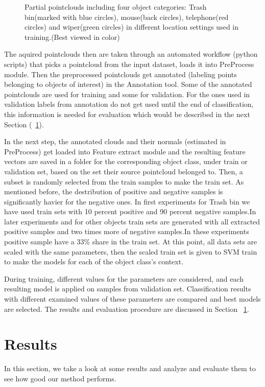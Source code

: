 \begin{figure} [htp]
\begin{center}
  \end{center}
  \caption[Train set pointclouds including four different object class.]
  {Partial pointclouds including four object categories: Trash bin(marked with blue circles), mouse(back circles), telephone(red circles) and wiper(green circles) in different location settings used in training.(Best viewed in color)}
  \label{TrainClouds2.figure:edge}
\end{figure}




The aquired pointclouds then are taken through an automated workflow (python scripts) that picks a pointcloud from the input dataset, loads it into PreProcess module. Then the preprocessed pointclouds get annotated (labeling points belonging to objects of interest) in the Annotation tool.
Some of the annotated pointclouds are used for training and some for validation. 
For the ones used in validation labels from annotation do not get used until the end of classification, this information is needed for evaluation which would be described in the next Section (~\ref{Results.sec}).


In the next step, the annotated clouds and their normals (estimated in PreProcess) get loaded into Feature extract module 
and the resulting feature vectors are saved in a folder for the corresponding object class, under train or validation set, based on the set their source pointcloud belonged to.
Then, a subset is randomly selected from the train samples to make the train set. As mentioned before, the destribution of positive and negative samples is significantly havier for the negative ones. In first experiments for Trash bin we have used train sets with 10 percent positive and 90 percent negative samples.In later experiments and for other objects train sets are generated with all extracted positive samples and two times more of negative samples.In these experiments positive sample have a 33\% share in the train set. At this point, all data sets are scaled with the same parameters, then the scaled train set is given to SVM train to make the models for each of the object class's context. 


During training, different values for the parameters are considered, and each resulting model is applied on samples from validation
set. Classification results with different examined values of these parameters are compared and best models are selected. 
The results and evaluation procedure are discussed in Section ~\ref{Results.sec}.

\section{Results}
\label{Results.sec}
In this section, we take a look at some results and analyze and evaluate them to see how good our method performs.

